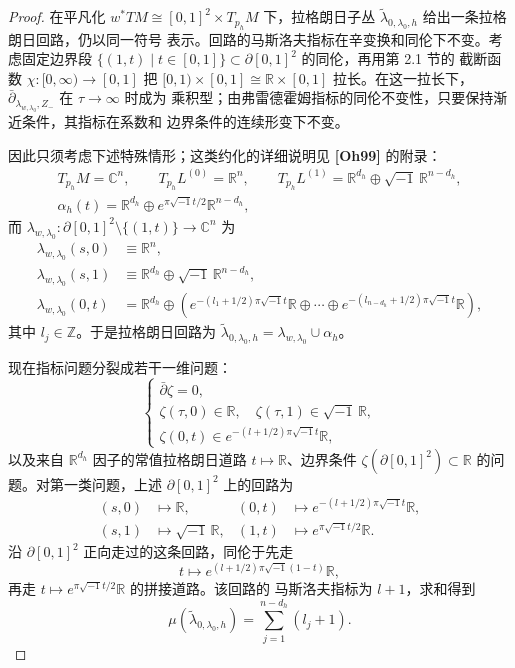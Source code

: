 \begin{proof}
在平凡化
$w^*TM\cong[0,1]^2\times T_{p_h}M$ 下，拉格朗日子丛
$\widetilde\lambda_{0,\lambda_0,h}$ 给出一条拉格朗日回路，仍以同一符号
表示。回路的马斯洛夫指标在辛变换和同伦下不变。考虑固定边界段
$\{(1,t)\mid t\in[0,1]\}\subset\partial[0,1]^2$ 的同伦，再用第 2.1 节的
截断函数 $\chi\colon[0,\infty)\to[0,1]$ 把
$[0,1)\times[0,1]\cong\mathbb R\times[0,1]$ 拉长。在这一拉长下，
$\bar\partial_{\lambda_{w,\lambda_0},Z_-}$ 在 $\tau\to\infty$ 时成为
乘积型；由弗雷德霍姆指标的同伦不变性，只要保持渐近条件，其指标在系数和
边界条件的连续形变下不变。

因此只须考虑下述特殊情形；这类约化的详细说明见 \textbf{[Oh99]} 的附录：
\[
\begin{gathered}
 T_{p_h}M=\mathbb C^n,\qquad
 T_{p_h}L^{(0)}=\mathbb R^n,\qquad
 T_{p_h}L^{(1)}
 =\mathbb R^{d_h}\oplus\sqrt{-1}\,\mathbb R^{n-d_h},\\
 \alpha_h(t)
 =\mathbb R^{d_h}\oplus
 e^{\pi\sqrt{-1}t/2}\mathbb R^{n-d_h},
\end{gathered}
\]
而
$\lambda_{w,\lambda_0}\colon
\partial[0,1]^2\setminus\{(1,t)\}\to\mathbb C^n$ 为
\[
\begin{aligned}
 \lambda_{w,\lambda_0}(s,0)&\equiv\mathbb R^n,\\
 \lambda_{w,\lambda_0}(s,1)&\equiv
 \mathbb R^{d_h}\oplus\sqrt{-1}\,\mathbb R^{n-d_h},\\
 \lambda_{w,\lambda_0}(0,t)&=
 \mathbb R^{d_h}\oplus
 \left(
 e^{-(l_1+1/2)\pi\sqrt{-1}t}\mathbb R
 \oplus\cdots\oplus
 e^{-(l_{n-d_h}+1/2)\pi\sqrt{-1}t}\mathbb R
 \right),
\end{aligned}
\]
其中 $l_j\in\mathbb Z$。于是拉格朗日回路为
$\widetilde\lambda_{0,\lambda_0,h}
=\lambda_{w,\lambda_0}\cup\alpha_h$。

现在指标问题分裂成若干一维问题：
\[
 \begin{cases}
  \bar\partial\zeta=0,\\
  \zeta(\tau,0)\in\mathbb R,\quad
  \zeta(\tau,1)\in\sqrt{-1}\,\mathbb R,\\
  \zeta(0,t)\in
  e^{-(l+1/2)\pi\sqrt{-1}t}\mathbb R,
 \end{cases}
\]
以及来自 $\mathbb R^{d_h}$ 因子的常值拉格朗日道路
$t\mapsto\mathbb R$、边界条件
$\zeta(\partial[0,1]^2)\subset\mathbb R$ 的问题。对第一类问题，上述
$\partial[0,1]^2$ 上的回路为
\[
\begin{aligned}
 (s,0)&\longmapsto\mathbb R,&
 (0,t)&\longmapsto e^{-(l+1/2)\pi\sqrt{-1}t}\mathbb R,\\
 (s,1)&\longmapsto\sqrt{-1}\,\mathbb R,&
 (1,t)&\longmapsto e^{\pi\sqrt{-1}t/2}\mathbb R.
\end{aligned}
\]
沿 $\partial[0,1]^2$ 正向走过的这条回路，同伦于先走
\[
 t\longmapsto e^{(l+1/2)\pi\sqrt{-1}(1-t)}\mathbb R,
\]
再走
$t\longmapsto e^{\pi\sqrt{-1}t/2}\mathbb R$ 的拼接道路。该回路的
马斯洛夫指标为 $l+1$，求和得到
\[
 \mu(\widetilde\lambda_{0,\lambda_0,h})
 =
 \sum_{j=1}^{n-d_h}(l_j+1).
\]


\end{proof}
